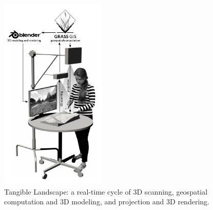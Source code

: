 \documentclass[Afour,sagev,times]{sagej} %
\newcommand{\ra}[1]{\renewcommand{\arraystretch}{#1}}
\begin{document}
\begin{figure}
    \begin{center}
        \includegraphics[width=0.45\textwidth]{images/diagrams/rendered_diagram_2.pdf}
        \caption{Tangible Landscape: a real-time cycle of 3D scanning, geospatial computation and 3D modeling, and projection and 3D rendering.}
        \label{fig:system_diagram}
    \end{center}
\end{figure}

\end{document}
